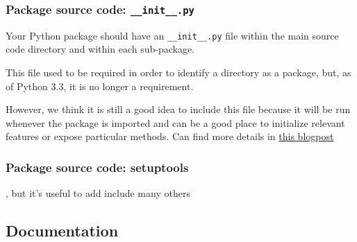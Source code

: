 \documentclass[10pt]{beamer}
\begin{document}
  \begin{frame} \frametitle{Package source code: \texttt{\_\_init\_\_.py}}

    Your Python package should have an \texttt{\_\_init\_\_.py} file within the main
    source code directory and within each sub-package.

    \vspace{0.25cm}

    This file used to be required in order to identify a directory as a package, but, as
    of Python 3.3, it is no longer a requirement.

    \vspace{0.25cm}

    However, we think it is still a good idea to include this file because it will be run
    whenever the package is imported and can be a good place to initialize relevant
    features or expose particular methods. Can find more details in
    \href{http://python-notes.curiousefficiency.org/en/latest/python_concepts/import_traps.html}{this blogpost}

  \end{frame}

  \begin{frame} \frametitle{Package source code: setuptools}


    \vspace{0.25cm}


    \vspace{0.25cm}

    , but it's useful to add
    include many others

  \end{frame}

  \subsection{Documentation}
\end{document}
